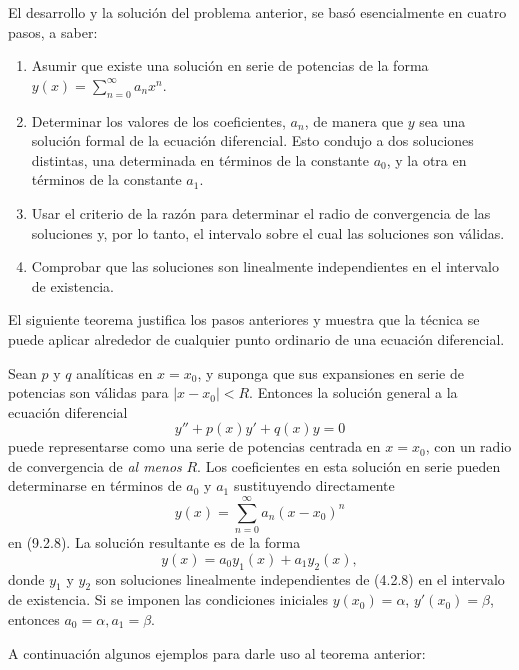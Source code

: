 El desarrollo y la soluci\'on del problema anterior, se bas\'o esencialmente en cuatro pasos, a saber: 

\begin{remark}
    \begin{enumerate}
    \item Asumir que existe una solución en serie de potencias de la forma $y(x) = \sum_{n=0}^{\infty} a_n x^n$.
    \item Determinar los valores de los coeficientes, $a_n$, de manera que $y$ sea una solución formal de la ecuación diferencial. Esto condujo a dos soluciones distintas, una determinada en términos de la constante $a_0$, y la otra en términos de la constante $a_1$.
    \item Usar el criterio de la razón para determinar el radio de convergencia de las soluciones y, por lo tanto, el intervalo sobre el cual las soluciones son válidas.
    \item Comprobar que las soluciones son linealmente independientes en el intervalo de existencia.
\end{enumerate}

\end{remark}

El siguiente teorema justifica los pasos anteriores y muestra que la técnica se puede aplicar alrededor de cualquier punto ordinario de una ecuación diferencial.

\begin{theorem}
    Sean $p$ y $q$ analíticas en $x = x_0$, y suponga que sus expansiones en serie de potencias son válidas para $|x - x_0| < R$. Entonces la solución general a la ecuación diferencial
\begin{equation} \tag{4.2.8}
y'' + p(x)y' + q(x)y = 0
\end{equation}
puede representarse como una serie de potencias centrada en $x = x_0$, con un radio de convergencia de \textit{al menos} $R$. Los coeficientes en esta solución en serie pueden determinarse en términos de $a_0$ y $a_1$ sustituyendo directamente
\[ y(x) = \sum_{n=0}^{\infty} a_n(x - x_0)^n \]
en (9.2.8). La solución resultante es de la forma
\[ y(x) = a_0 y_1(x) + a_1 y_2(x), \]
donde $y_1$ y $y_2$ son soluciones linealmente independientes de (4.2.8) en el intervalo de existencia. Si se imponen las condiciones iniciales $y(x_0) = \alpha$, $y'(x_0) = \beta$, entonces $a_0 = \alpha, a_1 = \beta$.

\end{theorem}

A continuaci\'on algunos ejemplos para darle uso al teorema anterior: 

